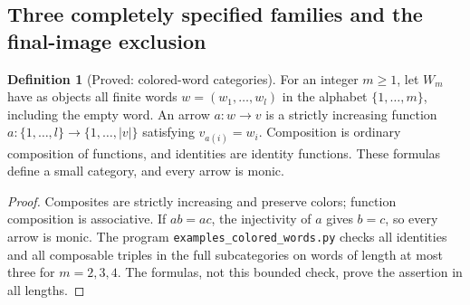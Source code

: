 \documentclass[11pt,a4paper]{article}
\theoremstyle{definition}
\newtheorem{definition}[theorem]{Definition}
\begin{document}
\subsection{Three completely specified families and the final-image exclusion}
\begin{definition}[Proved: colored-word categories]\label{E:word-definition}
For an integer $m\geq1$, let $W_m$ have as objects all finite words
$w=(w_1,\ldots,w_l)$ in the alphabet $\{1,\ldots,m\}$, including
the empty word. An arrow $a:w\to v$ is a strictly increasing
function $a:\{1,\ldots,l\}\to\{1,\ldots,|v|\}$ satisfying
$v_{a(i)}=w_i$. Composition is ordinary composition of functions,
and identities are identity functions. These formulas define a
small category, and every arrow is monic.
\end{definition}
\begin{proof}
Composites are strictly increasing and preserve colors; function
composition is associative. If $ab=ac$, the injectivity of $a$
gives $b=c$, so every arrow is monic. The program
\texttt{examples\_colored\_words.py} checks all identities and
all composable triples in the full subcategories on words of
length at most three for $m=2,3,4$. The formulas, not this bounded
check, prove the assertion in all lengths.
\end{proof}
\end{document}
